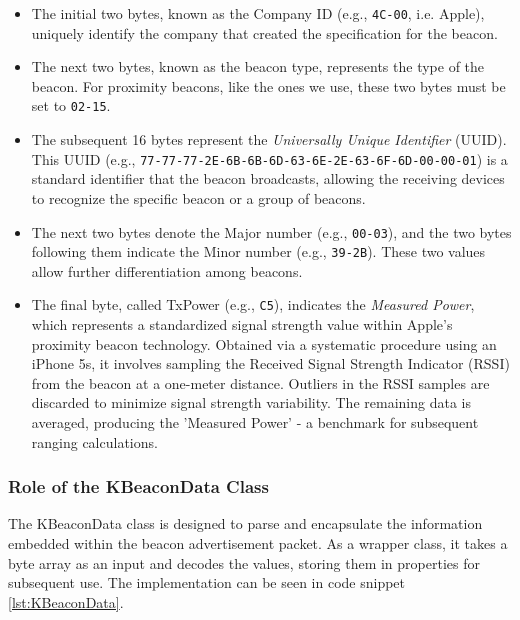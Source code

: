\begin{itemize}
  \item The initial two bytes, known as the Company ID (e.g., \texttt{4C-00}, i.e. Apple), uniquely identify the company that created the specification for the beacon.
  \item The next two bytes, known as the beacon type, represents the type of the beacon. For proximity beacons, like the ones we use, these two bytes must be set to \texttt{02-15}.
  \item The subsequent 16 bytes represent the \textit{Universally Unique Identifier} (UUID).
This UUID (e.g., \texttt{77-77-77-2E-6B-6B-6D-63-6E-2E-63-6F-6D-00-00-01}) is a standard identifier that the beacon broadcasts, allowing the receiving devices to recognize the specific beacon or a group of beacons.
  \item The next two bytes denote the Major number (e.g., \texttt{00-03}), and the two bytes following them indicate the Minor number (e.g., \texttt{39-2B}).
These two values allow further differentiation among beacons.
  \item The final byte, called TxPower (e.g., \texttt{C5}), indicates the \textit{Measured Power}, which represents a standardized signal strength value within Apple's proximity beacon technology. Obtained via a systematic procedure using an iPhone 5s, it involves sampling the Received Signal Strength Indicator (RSSI) from the beacon at a one-meter distance. Outliers in the RSSI samples are discarded to minimize signal strength variability. The remaining data is averaged, producing the 'Measured Power' - a benchmark for subsequent ranging calculations.
\end{itemize}
\cite{apple2023ibeacon}

\subsubsection{Role of the KBeaconData Class}

The KBeaconData class is designed to parse and encapsulate the information embedded within the beacon advertisement packet.
As a wrapper class, it takes a byte array as an input and decodes the values, storing them in properties for subsequent use.
The implementation can be seen in code snippet \ref{lst:KBeaconData}.




